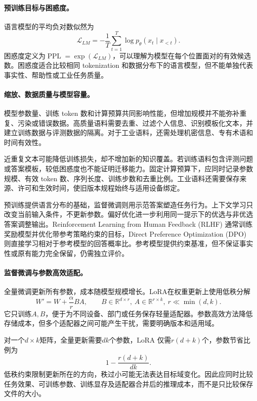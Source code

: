\paragraph{预训练目标与困惑度。}
语言模型的平均负对数似然为
\begin{equation}
 \mathcal{L}_{LM}=-\frac1T\sum_{t=1}^{T}\log p_\theta(x_t\mid x_{<t}).
\end{equation}
困惑度定义为$\operatorname{PPL}=\exp(\mathcal{L}_{LM})$，可以理解为模型在每个位置面对的有效候选数。困惑度适合比较相同 tokenization 和数据分布下的语言模型，但不能单独代表事实性、帮助性或工业任务质量。

\paragraph{缩放、数据质量与模型容量。}
模型参数量、训练 token 数和计算预算共同影响性能，但增加规模并不能弥补重复、污染或错误数据。高质量语料需要去重、过滤个人信息、识别模板化文本，并建立训练数据与评测数据的隔离。对于工业语料，还需处理机密信息、专有术语和时间有效性。

近重复文本可能降低训练损失，却不增加新的知识覆盖。若训练语料包含评测问题或答案模板，较低困惑度也不能证明迁移能力。固定计算预算下，应同时记录参数规模、有效 token 数、序列长度、训练步数和去重比例。工业语料还需要保存来源、许可和生效时间，使旧版本规程始终与适用设备绑定。

预训练提供语言分布的基础，监督微调则用示范答案塑造任务行为。上下文学习只改变当前输入条件，不更新参数。偏好优化进一步利用同一提示下的优选与非优选答案调整输出。Reinforcement Learning from Human Feedback (RLHF) 通常训练奖励模型并优化带参考策略约束的目标，Direct Preference Optimization (DPO) 则直接学习相对于参考模型的回答概率比。参考模型提供约束基准，但不保证事实性或原有能力完全保留，仍需独立评价。

\paragraph{监督微调与参数高效适配。}
全量微调更新所有参数，成本随模型规模增长。LoRA在权重更新上使用低秩分解
\begin{equation}
 W'=W+\frac{\alpha}{r}BA,\qquad B\in\mathbb{R}^{d\times r},\ A\in\mathbb{R}^{r\times k},\ r\ll\min(d,k).
\end{equation}
它只训练$A,B$，便于为不同设备、部门或任务保存轻量适配器。参数高效方法降低存储成本，但多个适配器之间可能产生干扰，需要明确版本和适用域。

对一个$d\times k$矩阵，全量更新需要$dk$个参数，LoRA 仅需$r(d+k)$个，参数节省比例为
\begin{equation}
 1-\frac{r(d+k)}{dk}.
\end{equation}
低秩约束限制更新所在的方向，秩过小可能无法表达目标域变化。因此应同时比较任务效果、可训练参数、训练显存及适配器合并后的推理成本，而不是只比较保存文件的大小。

